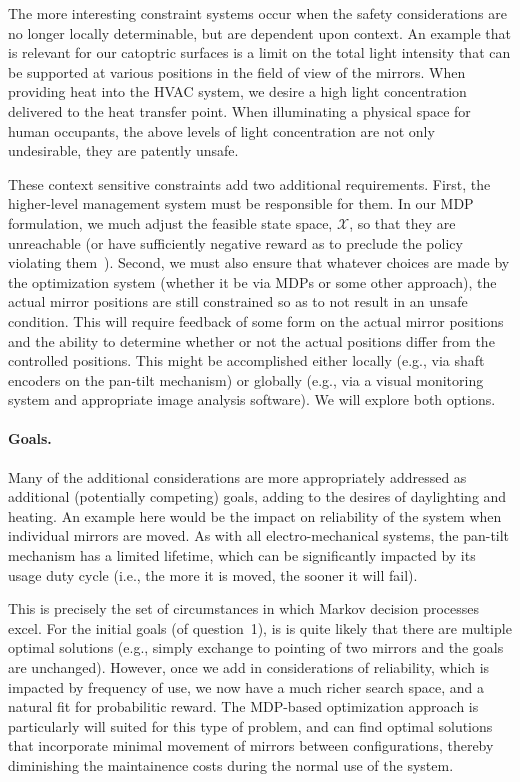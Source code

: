 The more interesting constraint systems occur when the safety considerations
are no longer locally determinable, but are dependent upon context.
An example that is relevant for our catoptric surfaces is a limit on
the total light intensity that can be supported at various positions in the
field of view of the mirrors. When providing heat into the HVAC system,
we desire a high light concentration delivered to the heat transfer point.
When illuminating a physical space for human occupants, the above
levels of light concentration are not only undesirable, they are patently
unsafe.

These context sensitive constraints add two additional requirements.
First, the higher-level management system must be responsible for them.
In our MDP formulation, we much adjust the feasible state space, $\mathcal{X}$,
so that they are unreachable (or have sufficiently negative reward as to
preclude the policy violating them~\cite{tblwgs11,tggs10}).
Second, we must also ensure that whatever choices are made by the optimization
system (whether it be via MDPs or some other approach), the actual
mirror positions are still constrained so as to not result in an
unsafe condition.  This will require feedback of some form on the actual
mirror positions and the ability to determine whether or not the actual
positions differ from the controlled positions.  This might be accomplished
either locally (e.g., via shaft encoders on the pan-tilt mechanism) or
globally (e.g., via a visual monitoring system and appropriate image analysis
software).
We will explore both options.

\paragraph{Goals.}
Many of the additional considerations are more appropriately addressed as
additional (potentially competing) goals, adding to the desires of
daylighting and heating.  An example here would be the
impact on reliability of the system when individual mirrors are moved.  As
with all electro-mechanical systems, the pan-tilt mechanism has a limited
lifetime, which can be significantly impacted by its usage duty cycle
(i.e., the more it is moved, the sooner it will fail).

This is precisely the set of circumstances in which Markov decision
processes excel. For the initial goals (of question~1), is is quite
likely that there are multiple optimal solutions (e.g., simply exchange
to pointing of two mirrors and the goals are unchanged).  However,
once we add in considerations of reliability, which is impacted by
frequency of use, we now have a much richer search space,
and a natural fit for probabilitic reward.
The MDP-based optimization approach is particularly will suited for
this type of problem, and can find optimal solutions that incorporate
minimal movement of mirrors between configurations, thereby diminishing
the maintainence costs during the normal use of the system.

